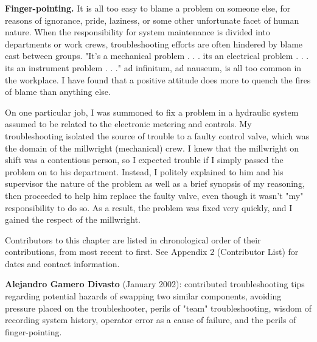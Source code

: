 {\bf Finger-pointing.} It is all too easy to blame a problem on someone
else, for reasons of ignorance, pride, laziness, or some other
unfortunate facet of human nature. When the responsibility for system
maintenance is divided into departments or work crews, troubleshooting
efforts are often hindered by blame cast between groups. "It's a
mechanical problem . . . its an electrical problem . . . its an
instrument problem . . ." ad infinitum, ad nauseum, is all too common in
the workplace. I have found that a positive attitude does more to quench
the fires of blame than anything else.

On one particular job, I was summoned to fix a problem in a hydraulic
system assumed to be related to the electronic metering and controls. My
troubleshooting isolated the source of trouble to a faulty control
valve, which was the domain of the millwright (mechanical) crew. I knew
that the millwright on shift was a contentious person, so I expected
trouble if I simply passed the problem on to his department. Instead, I
politely explained to him and his supervisor the nature of the problem
as well as a brief synopsis of my reasoning, then proceeded to help him
replace the faulty valve, even though it wasn't "my" responsibility to
do so. As a result, the problem was fixed very quickly, and I gained the
respect of the millwright.

\stopsection

\startsection[title={Contributors},reference={sec:xtocid157909726}]

Contributors to this chapter are listed in chronological order of their
contributions, from most recent to first. See Appendix 2 (Contributor
List) for dates and contact information.

{\bf Alejandro Gamero Divasto} (January 2002): contributed
troubleshooting tips regarding potential hazards of swapping two similar
components, avoiding pressure placed on the troubleshooter, perils of
"team" troubleshooting, wisdom of recording system history, operator
error as a cause of failure, and the perils of finger-pointing.

\stopsection

\stopchapter

